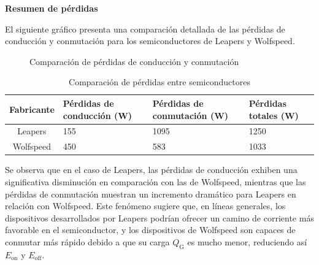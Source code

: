 \textbf{Resumen de pérdidas}

El siguiente gráfico presenta una comparación detallada de las pérdidas de conducción y conmutación para los semiconductores de Leapers y Wolfspeed.

\begin{figure}[H]
	\centering
	\caption{Comparación de pérdidas de conducción y conmutación}
	\label{fig:loss_comparison}
\end{figure}

\begin{table}[H]
	\centering
	\begin{tabular}{|c|p{3.5cm}|p{3.5cm}|p{3.5cm}|}
		\hline
		\textbf{Fabricante} & \textbf{Pérdidas de conducción (W)} & \textbf{Pérdidas de conmutación (W)} & \textbf{Pérdidas totales (W)} \\
		\hline
		Leapers & 155 & 1095 & 1250 \\
		\hline
		Wolfspeed & 450 & 583 & 1033 \\
		\hline
	\end{tabular}
	\caption{Comparación de pérdidas entre semiconductores}
\end{table}

Se observa que en el caso de Leapers, las pérdidas de conducción exhiben una significativa disminución en comparación con las de Wolfspeed, mientras que las pérdidas de conmutación muestran un incremento dramático para Leapers en relación con Wolfspeed. Este fenómeno sugiere que, en líneas generales, los dispositivos desarrollados por Leapers podrían ofrecer un camino de corriente más favorable en el semiconductor, y los dispositivos de Wolfspeed son capaces de conmutar más rápido debido a que su carga $Q_{\text{G}}$ es mucho menor, reduciendo así $E_{\text{on}}$ y $E_{\text{off}}$.

